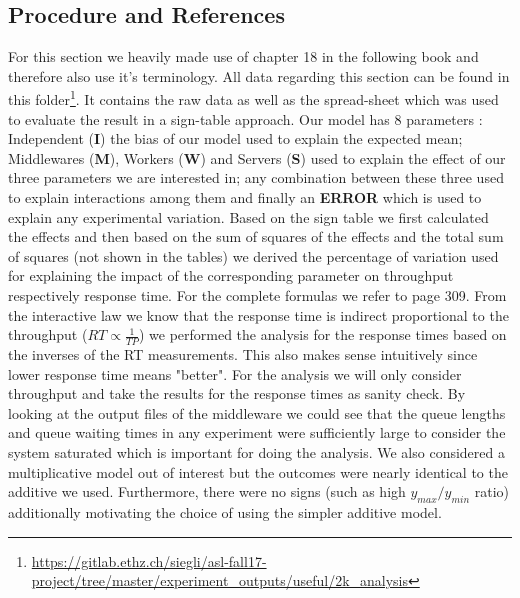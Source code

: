 \documentclass[11pt,a4paper]{article}
\let\tb\textbf
\begin{document}
\subsection{Procedure and References}
For this section we heavily made use of chapter 18 in the following book \cite{performance_book} and therefore also use it's terminology. All data regarding this section can be found in this folder\footnote{\url{https://gitlab.ethz.ch/siegli/asl-fall17-project/tree/master/experiment_outputs/useful/2k_analysis}}. It contains the raw data as well as the spread-sheet which was used to evaluate the result in a sign-table approach. Our model has 8 parameters : Independent (\tb{I}) the bias of our model used to explain the expected mean;  Middlewares (\tb{M}), Workers (\tb{W}) and Servers (\tb{S}) used to explain the effect of our three parameters we are interested in; any combination between these three used to explain interactions among them and finally an \tb{ERROR} which is used to explain any experimental variation. Based on the sign table we first calculated the effects and then based on the sum of squares of the effects and the total sum of squares (not shown in the tables) we derived the percentage of variation used for explaining the impact of the corresponding parameter on throughput respectively response time. For the complete formulas we refer to \cite{performance_book} page 309. From the interactive law we know that the response time is indirect proportional to the throughput ($RT \propto \frac{1}{TP}$) we performed the analysis for the response times based on the inverses of the RT measurements. This also makes sense intuitively since lower response time means "better". For the analysis we will only consider throughput and take the results for the response times as sanity check. By looking at the output files of the middleware we could see that the queue lengths and queue waiting times in any experiment were sufficiently large to consider the system saturated which is important for doing the analysis. We also considered a multiplicative model out of interest but the outcomes were nearly identical to the additive we used. Furthermore, there were no signs (such as high $y_{max}/y_{min}$ ratio) additionally motivating the choice of using the simpler additive model.
\end{document}
